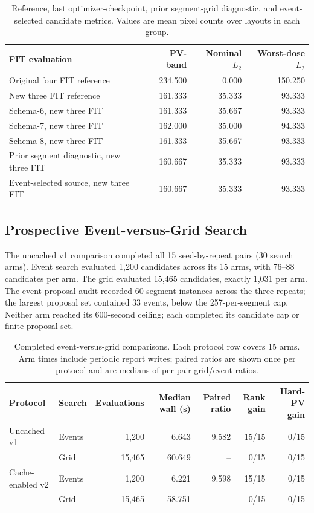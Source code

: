 \documentclass[conference]{IEEEtran}
\begin{document}
\begin{table}[t]
\caption{Reference, last optimizer-checkpoint, prior segment-grid diagnostic, and event-selected candidate metrics. Values are mean pixel counts over layouts in each group.}
\label{tab:reference}
\centering
\begin{tabular}{lrrr}
\hline
FIT evaluation & PV-band & Nominal $L_2$ & Worst-dose $L_2$ \\
\hline
Original four FIT reference & 234.500 & 0.000 & 150.250 \\
New three FIT reference & 161.333 & 35.333 & 93.333 \\
Schema-6, new three FIT & 161.333 & 35.667 & 93.333 \\
Schema-7, new three FIT & 162.000 & 35.000 & 94.333 \\
Schema-8, new three FIT & 161.333 & 35.667 & 93.333 \\
Prior segment diagnostic, new three FIT & 160.667 & 35.333 & 93.333 \\
Event-selected source, new three FIT & 160.667 & 35.333 & 93.333 \\
\hline
\end{tabular}
\end{table}

\subsection{Prospective Event-versus-Grid Search}
The uncached v1 comparison completed all 15 seed-by-repeat pairs (30 search arms). Event search evaluated 1,200 candidates across its 15 arms, with 76--88 candidates per arm. The grid evaluated 15,465 candidates, exactly 1,031 per arm. The event proposal audit recorded 60 segment instances across the three repeats; the largest proposal set contained 33 events, below the 257-per-segment cap. Neither arm reached its 600-second ceiling; each completed its candidate cap or finite proposal set.

\begin{table}[t]
\caption{Completed event-versus-grid comparisons. Each protocol row covers 15 arms. Arm times include periodic report writes; paired ratios are shown once per protocol and are medians of per-pair grid/event ratios.}
\label{tab:eventgrid}
\centering
\begin{tabular}{llrrrrr}
\hline
Protocol & Search & Evaluations & Median wall (s) & Paired ratio & Rank gain & Hard-PV gain \\
\hline
Uncached v1 & Events & 1,200 & 6.643 & 9.582 & 15/15 & 0/15 \\
 & Grid & 15,465 & 60.649 & -- & 0/15 & 0/15 \\
Cache-enabled v2 & Events & 1,200 & 6.221 & 9.598 & 15/15 & 0/15 \\
 & Grid & 15,465 & 58.751 & -- & 0/15 & 0/15 \\
\hline
\end{tabular}
\end{table}
\end{document}
